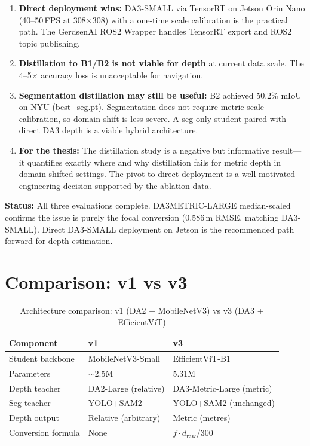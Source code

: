 \documentclass[11pt,a4paper]{article}
\begin{document}
\begin{enumerate}[nosep]
  \item \textbf{Direct deployment wins:} DA3-SMALL via TensorRT on Jetson
    Orin Nano (40--50\,FPS at 308$\times$308) with a one-time scale
    calibration is the practical path. The GerdsenAI ROS2 Wrapper
    handles TensorRT export and ROS2 topic publishing.
  \item \textbf{Distillation to B1/B2 is not viable for depth} at
    current data scale. The 4--5$\times$ accuracy loss is unacceptable
    for navigation.
  \item \textbf{Segmentation distillation may still be useful:} B2
    achieved 50.2\% mIoU on NYU (best\_seg.pt). Segmentation does not
    require metric scale calibration, so domain shift is less severe.
    A seg-only student paired with direct DA3 depth is a viable hybrid
    architecture.
  \item \textbf{For the thesis:} The distillation study is a negative
    but informative result---it quantifies exactly where and why
    distillation fails for metric depth in domain-shifted settings.
    The pivot to direct deployment is a well-motivated engineering
    decision supported by the ablation data.
\end{enumerate}

\textbf{Status:} All three evaluations complete. DA3METRIC-LARGE
median-scaled confirms the issue is purely the focal conversion
(0.586\,m RMSE, matching DA3-SMALL). Direct DA3-SMALL deployment
on Jetson is the recommended path forward for depth estimation.

\section{Comparison: v1 vs v3}
\label{sec:comparison}

\begin{table}[h]
\centering
\caption{Architecture comparison: v1 (DA2 + MobileNetV3) vs v3 (DA3 + EfficientViT)}
\label{tab:arch-compare}
\begin{tabular}{lll}
\toprule
\textbf{Component} & \textbf{v1} & \textbf{v3} \\
\midrule
Student backbone   & MobileNetV3-Small      & EfficientViT-B1 \\
Parameters         & $\sim$2.5M             & 5.31M \\
Depth teacher      & DA2-Large (relative)   & DA3-Metric-Large (metric) \\
Seg teacher        & YOLO+SAM2              & YOLO+SAM2 (unchanged) \\
Depth output       & Relative (arbitrary)   & Metric (metres) \\
Conversion formula & None                   & $f \cdot d_{\text{raw}} / 300$ \\
\bottomrule
\end{tabular}
\end{table}
\end{document}
